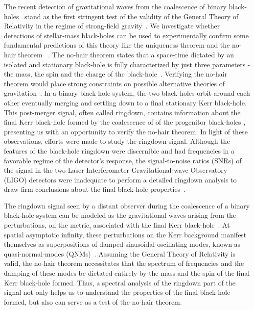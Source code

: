 The recent detection of gravitational waves from the coalescence of binary black-holes~\cite{PhysRevLett.116.061102,PhysRevLett.116.241103} stand as the first stringent test of the validity of the General Theory of Relativity in the regime of strong-field gravity~\cite{2013LRR....16....9Y,2016PhRvL.116v1101A,2016arXiv160308955Y}. We investigate whether detections of stellar-mass black-holes can be used to experimentally confirm some
fundamental predictions of this theory like the uniqueness
theorem and the no-hair theorem ~\cite{Misner:1974qy,PhysRevD.5.1239}. The no-hair theorem states that a space-time dictated by an isolated and stationary black-hole is fully characterized by just three parameters - the mass, the spin and the charge of the black-hole~\cite{PhysRevD.51.R6608,PhysRevLett.26.331}. Verifying the no-hair theorem would place strong constraints on possible alternative theories of gravitation~\cite{0264-9381-33-5-054001,0264-9381-32-21-214002}. In a binary black-hole system, the two black-holes orbit around each other eventually merging and settling down to a final stationary Kerr black-hole. This post-merger signal, often called ringdown, contains information about the final Kerr black-hole formed by the coalescence of of the progenitor black-holes \cite{0264-9381-21-4-003}, presenting us with an opportunity to verify the no-hair theorem. In light of these observations, efforts were made to study the ringdown signal. Although the features of the black-hole ringdown were discernible and had frequencies in a favorable regime of the detector's response, the signal-to-noise ratios (SNRs) of the signal in the two Laser Interferometer Gravitational-wave Observatory (LIGO) detectors were inadequate to perform a detailed ringdown analysis to draw firm conclusions about the final black-hole properties~\cite{2016PhRvL.116v1101A}. 

The ringdown signal seen by a distant observer during the coalescence of a binary black-hole system can be modeled as the gravitational waves arising from the perturbations, on the metric, associated with the final Kerr black-hole~\cite{PhysRevLett.72.3297}. At spatial asymptotic infinity, these perturbations on the Kerr background manifest themselves as superpositions of damped sinusoidal oscillating modes, known as quasi-normal-modes (QNMs)~\cite{4783,1973ApJ...185..635T,10.2307/78902,PhysRevD.40.3194,Nollert:1999ji,PhysRevD.60.022001}. Assuming the General Theory of Relativity is valid, the no-hair theorem necessitates that the spectrum of frequencies and the damping of these modes be dictated entirely by the mass and the spin of the final Kerr black-hole formed. Thus, a spectral analysis of the ringdown part of the signal not only helps us to understand the properties of the final black-hole formed, but also can serve as a test of the no-hair theorem.

